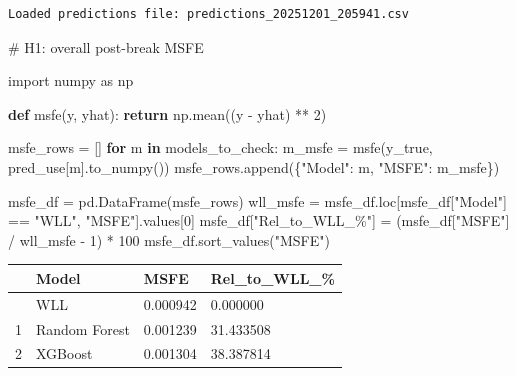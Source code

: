 \documentclass[
  letterpaper,
  DIV=11,
  numbers=noendperiod]{scrartcl}
\newenvironment{Shaded}{\begin{snugshade}}{\end{snugshade}}
\newcommand{\CommentTok}[1]{\textcolor[rgb]{0.37,0.37,0.37}{#1}}
\newcommand{\ControlFlowTok}[1]{\textcolor[rgb]{0.00,0.23,0.31}{\textbf{#1}}}
\newcommand{\DecValTok}[1]{\textcolor[rgb]{0.68,0.00,0.00}{#1}}
\newcommand{\ImportTok}[1]{\textcolor[rgb]{0.00,0.46,0.62}{#1}}
\newcommand{\KeywordTok}[1]{\textcolor[rgb]{0.00,0.23,0.31}{\textbf{#1}}}
\newcommand{\NormalTok}[1]{\textcolor[rgb]{0.00,0.23,0.31}{#1}}
\newcommand{\OperatorTok}[1]{\textcolor[rgb]{0.37,0.37,0.37}{#1}}
\newcommand{\StringTok}[1]{\textcolor[rgb]{0.13,0.47,0.30}{#1}}
\begin{document}
\begin{verbatim}
Loaded predictions file: predictions_20251201_205941.csv
\end{verbatim}

\begin{Shaded}
\begin{Highlighting}[]
\CommentTok{\# H1: overall post{-}break MSFE}

\ImportTok{import}\NormalTok{ numpy }\ImportTok{as}\NormalTok{ np}

\KeywordTok{def}\NormalTok{ msfe(y, yhat):}
    \ControlFlowTok{return}\NormalTok{ np.mean((y }\OperatorTok{{-}}\NormalTok{ yhat) }\OperatorTok{**} \DecValTok{2}\NormalTok{)}

\NormalTok{msfe\_rows }\OperatorTok{=}\NormalTok{ []}
\ControlFlowTok{for}\NormalTok{ m }\KeywordTok{in}\NormalTok{ models\_to\_check:}
\NormalTok{    m\_msfe }\OperatorTok{=}\NormalTok{ msfe(y\_true, pred\_use[m].to\_numpy())}
\NormalTok{    msfe\_rows.append(\{}\StringTok{"Model"}\NormalTok{: m, }\StringTok{"MSFE"}\NormalTok{: m\_msfe\})}

\NormalTok{msfe\_df }\OperatorTok{=}\NormalTok{ pd.DataFrame(msfe\_rows)}
\NormalTok{wll\_msfe }\OperatorTok{=}\NormalTok{ msfe\_df.loc[msfe\_df[}\StringTok{"Model"}\NormalTok{] }\OperatorTok{==} \StringTok{"WLL"}\NormalTok{, }\StringTok{"MSFE"}\NormalTok{].values[}\DecValTok{0}\NormalTok{]}
\NormalTok{msfe\_df[}\StringTok{"Rel\_to\_WLL\_\%"}\NormalTok{] }\OperatorTok{=}\NormalTok{ (msfe\_df[}\StringTok{"MSFE"}\NormalTok{] }\OperatorTok{/}\NormalTok{ wll\_msfe }\OperatorTok{{-}} \DecValTok{1}\NormalTok{) }\OperatorTok{*} \DecValTok{100}
\NormalTok{msfe\_df.sort\_values(}\StringTok{"MSFE"}\NormalTok{)}
\end{Highlighting}
\end{Shaded}

\begin{longtable}[]{@{}llll@{}}
\toprule\noalign{}
& Model & MSFE & Rel\_to\_WLL\_\% \\
\midrule\noalign{}
\endhead
\bottomrule\noalign{}
\endlastfoot
0 & WLL & 0.000942 & 0.000000 \\
1 & Random Forest & 0.001239 & 31.433508 \\
2 & XGBoost & 0.001304 & 38.387814 \\
\end{longtable}
\end{document}
